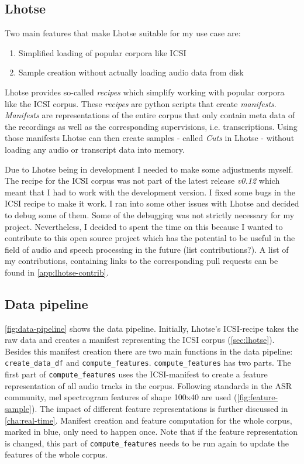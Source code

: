 \documentclass[bsc,frontabs,parskip,deptreport]{infthesis}
\begin{document}
\subsection{Lhotse} \label{sec:lhotse}
Two main features that make Lhotse suitable for my use case are:
\begin{enumerate}
    \item Simplified loading of popular corpora like ICSI
    \item Sample creation without actually loading audio data from disk
\end{enumerate}

Lhotse provides so-called \textit{recipes} which simplify working with popular corpora like the ICSI corpus.
These \textit{recipes} are python scripts that create \textit{manifests}.
\textit{Manifests} are representations of the entire corpus that only contain meta data of the recordings as well as the corresponding supervisions, i.e. transcriptions.
Using those manifests Lhotse can then create samples - called \textit{Cuts} in Lhotse - without loading any audio or transcript data into memory. 

Due to Lhotse being in development I needed to make some adjustments myself. The recipe for the ICSI corpus was not part of the latest release \textit{v0.12} which meant that I had to work with the development version. 
I fixed some bugs in the ICSI recipe to make it work. 
I ran into some other issues with Lhotse and decided to debug some of them. Some of the debugging was not strictly necessary for my project. 
Nevertheless, I decided to spent the time on this because I wanted to contribute to this open source project which has the potential to be useful in the field of audio and speech processing in the future (list contributions?). A list of my contributions, containing links to the corresponding pull requests can be found in \autoref{app:lhotse-contrib}.

\subsection{Data pipeline} \label{sec:ml-data-pipeline}

\autoref{fig:data-pipeline} shows the data pipeline.
Initially, Lhotse's ICSI-recipe takes the raw data and creates a manifest representing the ICSI corpus (\autoref{sec:lhotse}).
Besides this manifest creation there are two main functions in the data pipeline: \verb|create_data_df| and \verb|compute_features|. 
\verb|compute_features| has two parts.
The first part of \verb|compute_features| uses the ICSI-manifest to create a feature representation of all audio tracks in the corpus. Following standards in the ASR community, mel spectrogram features of shape 100x40 are used (\autoref{fig:feature-sample}). The impact of different feature representations is further discussed in \autoref{cha:real-time}. 
Manifest creation and feature computation for the whole corpus, marked in blue, only need to happen once.
Note that if the feature representation is changed, this part of \verb|compute_features| needs to be run again to update the features of the whole corpus.
\end{document}
